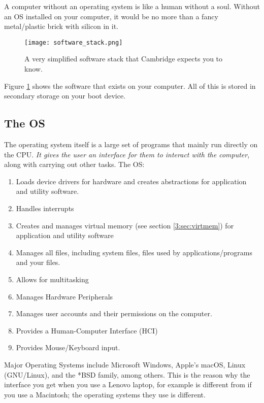 \documentclass[../main.tex]{subfiles}
\begin{document}
A computer without an operating system is like a human without a soul. Without an OS installed on your computer, it would be no more than a fancy metal/plastic brick with silicon in it. 

\begin{figure}[H]
    \centering
    \texttt{[image: software\_stack.png]}
    \caption{A very simplified software stack that Cambridge expects you to know.}
    \label{fig:software_stack}
\end{figure}

Figure \ref{fig:software_stack} shows the software that exists on your computer. All of this is stored in secondary storage on your boot device.

\subsection{The OS}

The operating system itself is a large set of programs that mainly run directly on the CPU. \emph{It gives the user an interface for them to interact with the computer}, along with carrying out other tasks. The OS:

\begin{enumerate}
    \item Loads device drivers for hardware and creates abstractions for application and utility software.
    \item Handles interrupts
    \item Creates and manages virtual memory (see section \ref{3:sec:virtmem}) for application and utility software
    \item Manages all files, including system files, files used by applications/programs and your files.
    \item Allows for multitasking
    \item Manages Hardware Peripherals
    \item Manages user accounts and their permissions on the computer.
    \item Provides a Human-Computer Interface (HCI)
    \item Provides Mouse/Keyboard input.
\end{enumerate}

Major Operating Systems include Microsoft Windows, Apple's macOS, Linux (GNU/Linux), and the *BSD family, among others. This is the reason why the interface you get when you use a Lenovo laptop, for example is different from if you use a Macintosh; the operating systems they use is different.
\end{document}
